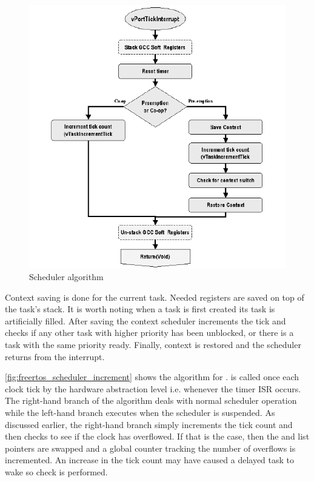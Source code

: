 \begin{figure}[H]

      \centering
      \includegraphics[width=0.8\linewidth]{images/freertos_scheduler_overview.pdf}
      \caption{Scheduler algorithm\citep[p~20]{freertos_inner_workings}}
      \label{fig:freertos_scheduler_overview}
    
\end{figure}

Context saving is done for the current task. Needed registers are saved on top of the task's stack. It is worth noting when a task is first created its task is artificially filled. After saving the context scheduler increments the tick and checks if any other task with higher priority has been unblocked, or there is a task with the same priority ready. Finally, context is restored and the scheduler returns from the interrupt.  

\autoref{fig:freertos_scheduler_increment} shows the algorithm for .  is called once each clock tick by the hardware abstraction level i.e. whenever the timer ISR occurs. The right-hand
branch of the algorithm deals with normal scheduler operation while the left-hand branch
executes when the scheduler is suspended. As discussed earlier, the right-hand branch
simply increments the tick count and then checks to see if the clock has overflowed. If
that is the case, then the  and  list pointers are
swapped and a global counter tracking the number of overflows is incremented. An
increase in the tick count may have caused a delayed task to wake so check is performed.

